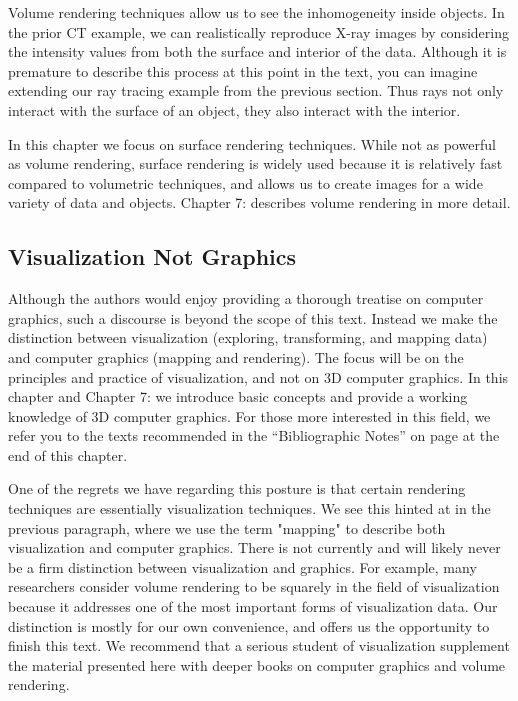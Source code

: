Volume rendering techniques allow us to see the inhomogeneity inside objects. In the prior CT example, we can realistically reproduce X-ray images by considering the intensity values from both the surface and interior of the data. Although it is premature to describe this process at this point in the text, you can imagine extending our ray tracing example from the previous section. Thus rays not only interact with the surface of an object, they also interact with the interior.

In this chapter we focus on surface rendering techniques. While not as powerful as volume rendering, surface rendering is widely used because it is relatively fast compared to volumetric techniques, and allows us to create images for a wide variety of data and objects. Chapter 7:  describes volume rendering in more detail.

\subsection{Visualization Not Graphics}

Although the authors would enjoy providing a thorough treatise on computer graphics, such a discourse is beyond the scope of this text. Instead we make the distinction between visualization (exploring, transforming, and mapping data) and computer graphics (mapping and rendering). The focus will be on the principles and practice of visualization, and not on 3D computer graphics. In this chapter and Chapter 7:  we introduce basic concepts and provide a working knowledge of 3D computer graphics. For those more interested in this field, we refer you to the texts recommended in the ``Bibliographic Notes'' on page \pageref{Ch03BibNotes} at the end of this chapter.

One of the regrets we have regarding this posture is that certain rendering techniques are essentially visualization techniques. We see this hinted at in the previous paragraph, where we use the term "mapping" to describe both visualization and computer graphics. There is not currently and will likely never be a firm distinction between visualization and graphics. For example, many researchers consider volume rendering to be squarely in the field of visualization because it addresses one of the most important forms of visualization data. Our distinction is mostly for our own convenience, and offers us the opportunity to finish this text. We recommend that a serious student of visualization supplement the material presented here with deeper books on computer graphics and volume rendering.


